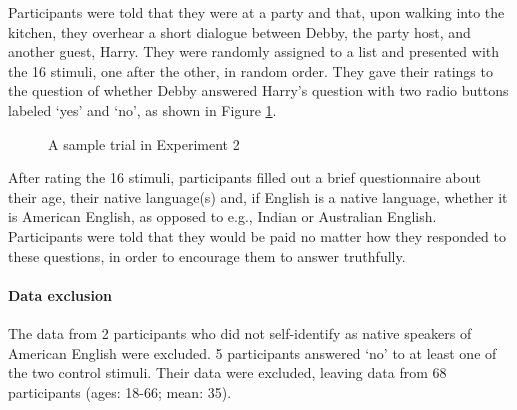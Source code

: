 \documentclass[11pt,fleqn]{article}
\newcommand{\6}{\mbox{$[\hspace*{-.6mm}[$}}
\newcommand{\9}{\mbox{$]\hspace*{-.6mm}]$}}
\begin{document}
Participants were told that they were at a party and that, upon walking into the kitchen, they overhear a short dialogue between Debby, the party host, and another guest, Harry. They were randomly assigned to a list and presented with the 16 stimuli, one after the other, in random order. They gave their ratings to the question of whether Debby answered Harry's question with two radio buttons labeled `yes' and `no', as shown in Figure \ref{f-trial-exp2}.  

\begin{figure}[H]
\centering


\caption{A sample trial in Experiment 2}\label{f-trial-exp2}
\end{figure}

After rating the 16 stimuli, participants filled out a brief questionnaire about their age, their native language(s) and, if English is a native language, whether it is
American English, as opposed to e.g., Indian or Australian English.
Participants were told that they would be paid no matter how they
responded to these questions, in order to encourage them to answer
truthfully.

\paragraph{Data exclusion} The data from 2 participants who did not self-identify as native speakers of American English were excluded. 5 participants answered `no' to at least one of the two control stimuli. Their data were excluded, leaving data from 68 participants (ages: 18-66; mean: 35).
\end{document}
